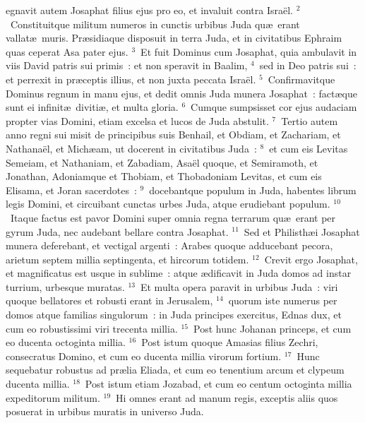 \bchapter
{}egnavit autem Josaphat filius ejus pro eo, et invaluit contra Isra\"el.
${}^{2}$~Constituitque militum numeros in cunctis urbibus Juda qu\ae\ erant vallat\ae\ muris. Pr\ae sidiaque disposuit in terra Juda, et in civitatibus Ephraim quas ceperat Asa pater ejus.
${}^{3}$~Et fuit Dominus cum Josaphat, quia ambulavit in viis David patris sui primis~: et non speravit in Baalim,
${}^{4}$~sed in Deo patris sui~: et perrexit in pr\ae ceptis illius, et non juxta peccata Isra\"el.
${}^{5}$~Confirmavitque Dominus regnum in manu ejus, et dedit omnis Juda munera Josaphat~: fact\ae que sunt ei infinit\ae\ diviti\ae , et multa gloria.
${}^{6}$~Cumque sumpsisset cor ejus audaciam propter vias Domini, etiam excelsa et lucos de Juda abstulit.
${}^{7}$~Tertio autem anno regni sui misit de principibus suis Benhail, et Obdiam, et Zachariam, et Nathana\"el, et Mich\ae am, ut docerent in civitatibus Juda~:
${}^{8}$~et cum eis Levitas Semeiam, et Nathaniam, et Zabadiam, Asa\"el quoque, et Semiramoth, et Jonathan, Adoniamque et Thobiam, et Thobadoniam Levitas, et cum eis Elisama, et Joran sacerdotes~:
${}^{9}$~docebantque populum in Juda, habentes librum legis Domini, et circuibant cunctas urbes Juda, atque erudiebant populum.
${}^{10}$~Itaque factus est pavor Domini super omnia regna terrarum qu\ae\ erant per gyrum Juda, nec audebant bellare contra Josaphat.
${}^{11}$~Sed et Philisth\ae i Josaphat munera deferebant, et vectigal argenti~: Arabes quoque adducebant pecora, arietum septem millia septingenta, et hircorum totidem.
${}^{12}$~Crevit ergo Josaphat, et magnificatus est usque in sublime~: atque \ae dificavit in Juda domos ad instar turrium, urbesque muratas.
${}^{13}$~Et multa opera paravit in urbibus Juda~: viri quoque bellatores et robusti erant in Jerusalem,
${}^{14}$~quorum iste numerus per domos atque familias singulorum~: in Juda principes exercitus, Ednas dux, et cum eo robustissimi viri trecenta millia.
${}^{15}$~Post hunc Johanan princeps, et cum eo ducenta octoginta millia.
${}^{16}$~Post istum quoque Amasias filius Zechri, consecratus Domino, et cum eo ducenta millia virorum fortium.
${}^{17}$~Hunc sequebatur robustus ad pr\ae lia Eliada, et cum eo tenentium arcum et clypeum ducenta millia.
${}^{18}$~Post istum etiam Jozabad, et cum eo centum octoginta millia expeditorum militum.
${}^{19}$~Hi omnes erant ad manum regis, exceptis aliis quos posuerat in urbibus muratis in universo Juda.

